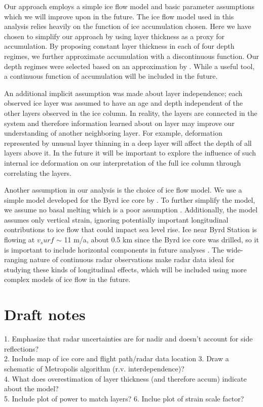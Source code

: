 \documentclass[draft,jgrga]{agutex}
\begin{document}
\begin{article}
Our approach employs a simple ice flow model and basic parameter assumptions which we will improve upon in the future. The ice flow model used in this analysis relies heavily on the function of ice accumulation chosen. Here we have chosen to simplify our approach by using layer thickness as a proxy for accumulation. By proposing constant layer thickness in each of four depth regimes, we further approximate accumulation with a discontinuous function. Our depth regimes were selected based on an approximation by \citet{hammer1994}. While a useful tool, a continuous function of accumulation will be included in the future.

An additional implicit assumption was made about layer independence; each observed ice layer was assumed to have an age and depth independent of the other layers observed in the ice column. In reality, the layers are connected in the system and therefore information learned about on layer may improve our understanding of another neighboring layer. For example, deformation represented by unusual layer thinning in a deep layer will affect the depth of all layers above it. In the future it will be important to explore the influence of such internal ice deformation on our interpretation of the full ice column through correlating the layers. 

Another assumption in our analysis is the choice of ice flow model. We use a simple model developed for the Byrd ice core by \citet{morland2009}. To further simplify the model, we assume no basal melting which is a poor assumption \citep{gow1968}. Additionally, the model assumes only vertical strain, ignoring potentially important longitudinal contributions to ice flow that could impact sea level rise. Ice near Byrd Station is flowing at $v_surf$ $\sim$ 11 m/a, about 0.5 km since the Byrd ice core was drilled, so it is important to include horizontal components in future analyses \citep{who?}. The wide-ranging nature of continuous radar observations make radar data ideal for studying these kinds of longitudinal effects, which will be included using more complex models of ice flow in the future.


\section{Draft notes}
1. Emphasize that radar uncertainties are for nadir and doesn't account for side reflections? \\
2. Include map of ice core and flight path/radar data location
3. Draw a schematic of Metropolis algorithm (r.v. interdependence)?\\
4. What does overestimation of layer thickness (and therefore accum) indicate about the model?\\
5. Include plot of power to match layers?
6. Inclue plot of strain scale factor?



\end{article}
\end{document}
